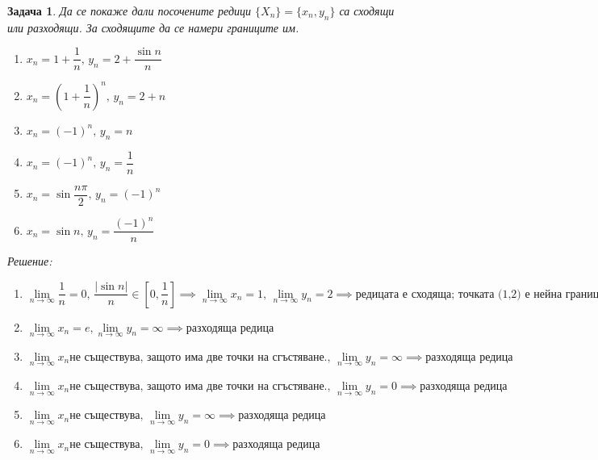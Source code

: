 \documentclass[a4paper,fleqn,12pt]{article}
\newtheorem{task}{Задача}[section]
\begin{document}
\begin{task}
Да се покаже дали посочените редици $\{ X_n \} = \{ x_n, y_n \}$ са сходящи или разходящи. За сходящите да се намери границите им.\\
\begin{enumerate}

\item $x_n = 1 + \dfrac{1}{n}, \, y_n = 2 + \dfrac{\sin{n}}{n}$
\item $x_n = \left( 1 + \dfrac{1}{n} \right) ^n, \, y_n = 2 + n $
\item $x_n = (-1)^n, \, y_n = n$
\item $x_n = (-1)^n, \, y_n = \dfrac{1}{n}$
\item $x_n =\sin{\dfrac{n \pi }{2}}, \, y_n = (-1)^n$
\item $x_n = \sin{n}, \, y_n = \dfrac{(-1)^n}{n}$

\end{enumerate}
Решение: \\
\begin{enumerate}

\item $\lim\limits_{n \to \infty} \dfrac{1}{n} = 0, \, \dfrac{\vert \sin{n} \vert}{n} \in \left[0, \dfrac{1}{n} \right] \implies 
\lim\limits_{n \to \infty} x_n = 1, \, \lim\limits_{n \to \infty} y_n = 2 \implies 
\text{редицата е сходяща; точката (1,2) е нейна граница}$

\item $ \lim\limits_{n \to \infty} x_n = e , \lim\limits_{n \to \infty} y_n = \infty \implies 
\text{разходяща редица} $

\item $ \lim\limits_{n \to \infty} x_n \text{не съществува, защото има две точки на сгъстяване.}, \,  
\lim\limits_{n \to \infty} y_n = \infty \implies \text{разходяща редица}$

\item $\lim\limits_{n \to \infty} x_n \text{не съществува, защото има две точки на сгъстяване.}, \,  
\lim\limits_{n \to \infty} y_n = 0 \implies \text{разходяща редица}$

\item $\lim\limits_{n \to \infty} x_n \text{не съществува}, \,  
\lim\limits_{n \to \infty} y_n = \infty \implies \text{разходяща редица}$

\item $\lim\limits_{n \to \infty} x_n \text{не съществува}, \,  
\lim\limits_{n \to \infty} y_n = 0 \implies \text{разходяща редица}$

\end{enumerate}

\end{task}
\end{document}
